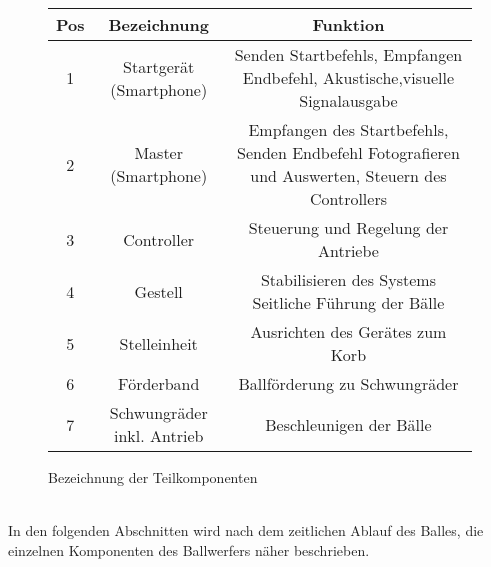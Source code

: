 \begin{figure}[h!]
	\centering
	\caption{Bezeichnung der Teilkomponenten}	
	\label{tab:BezTeilkomponenten}
	\begin{tabular}{|c|c|c|}
		\hline Pos & Bezeichnung & Funktion \\ 
		\hline 1 & Startgerät (Smartphone) & Senden Startbefehls, Empfangen Endbefehl, Akustische,visuelle Signalausgabe
		\\ 
		\hline 2 & Master  (Smartphone) & Empfangen des Startbefehls, Senden Endbefehl
		Fotografieren und Auswerten, Steuern des Controllers
		\\ 
		\hline 3 & Controller & Steuerung und Regelung der Antriebe \\ 
		\hline 4 & Gestell & Stabilisieren des Systems
		Seitliche Führung der Bälle
		\\ 
		\hline 5 & Stelleinheit & Ausrichten des Gerätes zum Korb \\ 
		\hline 6 & Förderband & Ballförderung zu Schwungräder \\ 
		\hline 7 & Schwungräder inkl. Antrieb & Beschleunigen der Bälle \\ 
		\hline 
	\end{tabular} 
\end{figure}\\
In den folgenden Abschnitten wird nach dem zeitlichen Ablauf des Balles, die einzelnen Komponenten des Ballwerfers näher beschrieben. 